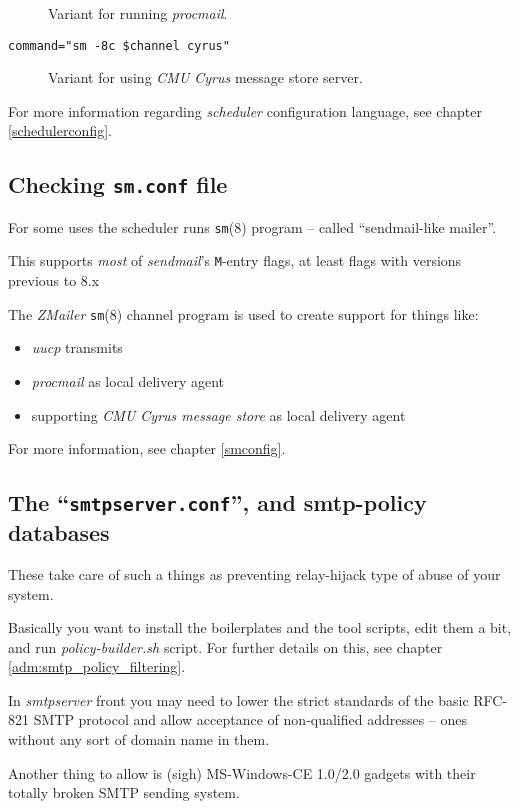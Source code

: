 \begin{multicols}{2}
\begin{description}
Variant for running {\em procmail}.

\item[{\tt command="sm -8c \$channel cyrus"}] \mbox{}

Variant for using {\em CMU Cyrus} message store server.
\end{description}

For more information regarding {\em scheduler} configuration language,
see chapter \vref{schedulerconfig}.

\subsection{Checking {\tt sm.conf} file}%

For some uses the scheduler runs {\tt sm}(8) program -- called
``sendmail-like mailer''.

This supports {\em most} of {\em sendmail}'s {\tt M}-entry flags,
at least flags with versions previous to 8.x

The {\em ZMailer} {\tt sm}(8) channel program is used to create support
for things like:
\begin{itemize}
\item {\em uucp} transmits
\item {\em procmail} as local delivery agent
\item supporting {\em CMU Cyrus message store} as local delivery agent
\end{itemize}

For more information, see chapter \vref{smconfig}.


\subsection{The ``{\tt smtpserver.conf}'', and smtp-policy databases}

These take care of such a things as preventing relay-hijack type
of abuse of your system.

Basically you want to install the boilerplates and the tool scripts,
edit them a bit, and run {\em policy-builder.sh} script.
For further details on this, see chapter \vref{adm:smtp_policy_filtering}.

In {\em smtpserver} front you may need to lower the strict standards
of the basic RFC-821 SMTP protocol and allow acceptance of non-qualified
addresses -- ones without any sort of domain name in them.

Another thing to allow is (sigh) MS-Windows-CE 1.0/2.0 gadgets with
their totally broken SMTP sending system.


\end{multicols}
